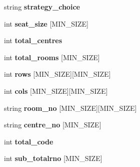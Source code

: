 \begin{DoxyCompactItemize}
\item 
\hypertarget{classSeatPlan_a0d4b7593a07f0fbc1dc78a5dd37a35f8}{string {\bfseries strategy\-\_\-choice}}\label{classSeatPlan_a0d4b7593a07f0fbc1dc78a5dd37a35f8}

\item 
\hypertarget{classSeatPlan_a4d0610dedf93291036146f52825cb408}{int {\bfseries seat\-\_\-size} \mbox{[}M\-I\-N\-\_\-\-S\-I\-Z\-E\mbox{]}}\label{classSeatPlan_a4d0610dedf93291036146f52825cb408}

\item 
\hypertarget{classSeatPlan_a3f700a5b683fc2161401a1bf9ad0e787}{int {\bfseries total\-\_\-centres}}\label{classSeatPlan_a3f700a5b683fc2161401a1bf9ad0e787}

\item 
\hypertarget{classSeatPlan_a821a3808cad5499bb080dba34af3a48c}{int {\bfseries total\-\_\-rooms} \mbox{[}M\-I\-N\-\_\-\-S\-I\-Z\-E\mbox{]}}\label{classSeatPlan_a821a3808cad5499bb080dba34af3a48c}

\item 
\hypertarget{classSeatPlan_a37744e9645b58d5c670aa3220452c477}{int {\bfseries rows} \mbox{[}M\-I\-N\-\_\-\-S\-I\-Z\-E\mbox{]}\mbox{[}M\-I\-N\-\_\-\-S\-I\-Z\-E\mbox{]}}\label{classSeatPlan_a37744e9645b58d5c670aa3220452c477}

\item 
\hypertarget{classSeatPlan_a5cf88f8e174d93cf2a22313e4e98ff34}{int {\bfseries cols} \mbox{[}M\-I\-N\-\_\-\-S\-I\-Z\-E\mbox{]}\mbox{[}M\-I\-N\-\_\-\-S\-I\-Z\-E\mbox{]}}\label{classSeatPlan_a5cf88f8e174d93cf2a22313e4e98ff34}

\item 
\hypertarget{classSeatPlan_a6476071e8ab23acdf8b9fa11aa5a9406}{string {\bfseries room\-\_\-no} \mbox{[}M\-I\-N\-\_\-\-S\-I\-Z\-E\mbox{]}\mbox{[}M\-I\-N\-\_\-\-S\-I\-Z\-E\mbox{]}}\label{classSeatPlan_a6476071e8ab23acdf8b9fa11aa5a9406}

\item 
\hypertarget{classSeatPlan_abbe4d33d19e99f37a84ad3e27f0cec5d}{string {\bfseries centre\-\_\-no} \mbox{[}M\-I\-N\-\_\-\-S\-I\-Z\-E\mbox{]}}\label{classSeatPlan_abbe4d33d19e99f37a84ad3e27f0cec5d}

\item 
\hypertarget{classSeatPlan_a348968d8e091da5d07ed9ef16295dfa7}{int {\bfseries total\-\_\-code}}\label{classSeatPlan_a348968d8e091da5d07ed9ef16295dfa7}

\item 
\hypertarget{classSeatPlan_a72c9d1b70da0ec6b41cd86e3f2795f4e}{int {\bfseries sub\-\_\-totalrno} \mbox{[}M\-I\-N\-\_\-\-S\-I\-Z\-E\mbox{]}}\label{classSeatPlan_a72c9d1b70da0ec6b41cd86e3f2795f4e}


\end{DoxyCompactItemize}
